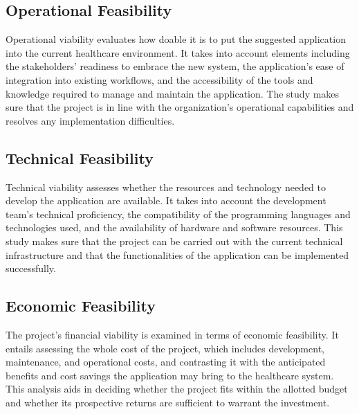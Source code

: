 \subsection*{Operational Feasibility}
Operational viability evaluates how doable it is to put the suggested application into the current
healthcare environment. It takes into account elements including the stakeholders' readiness to
embrace the new system, the application's ease of integration into existing workflows, and the
accessibility of the tools and knowledge required to manage and maintain the application. The
study makes sure that the project is in line with the organization's operational capabilities and
resolves any implementation difficulties.
\subsection*{Technical Feasibility}
Technical viability assesses whether the resources and technology needed to develop the
application are available. It takes into account the development team's technical proficiency, the
compatibility of the programming languages and technologies used, and the availability of 
hardware and software resources. This study makes sure that the project can be carried out with
the current technical infrastructure and that the functionalities of the application can be
implemented successfully.
\subsection*{Economic Feasibility}
The project's financial viability is examined in terms of economic feasibility. It entails assessing
the whole cost of the project, which includes development, maintenance, and operational costs,
and contrasting it with the anticipated benefits and cost savings the application may bring to the
healthcare system. This analysis aids in deciding whether the project fits within the allotted
budget and whether its prospective returns are sufficient to warrant the investment.
